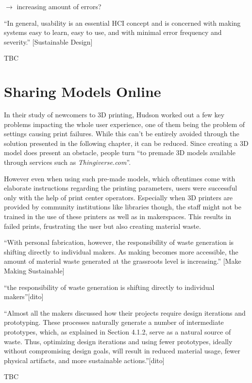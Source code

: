 $\rightarrow$ increasing amount of errors? 

``In general, usability is an essential HCI concept and is concerned with making systems easy to learn, easy to use, and with minimal error frequency and severity.'' [Sustainable Design]

TBC

\section{Sharing Models Online}

In their study of newcomers to 3D printing, Hudson \etal worked out a few key problems impacting the whole user experience, one of them being the problem of settings causing print failures.\cite{hudson_understanding_2016} 
While this can't be entirely avoided through the solution presented in the following chapter, it can be reduced. 
Since creating a 3D model does present an obstacle, people turn ``to premade 3D models available through services such as \textit{Thingiverse.com}''.\cite{hudson_understanding_2016}

However even when using such pre-made models, which oftentimes come with elaborate instructions regarding the printing parameters, users were successful only with the help of print center operators. 
Especially when 3D printers are provided by community institutions like libraries though, the staff might not be trained in the use of these printers as well as in makerspaces.
This results in failed prints, frustrating the user but also creating material waste. 


``With personal fabrication, however, the responsibility of waste generation is shifting directly to individual makers. As making becomes more accessible, the amount of material waste generated at the grassroots level is increasing.'' [Make Making Sustainable]

``the responsibility of waste generation is shifting directly to individual makers''[dito]

``Almost all the makers discussed how their projects require design iterations and prototyping. These processes naturally generate a number of intermediate prototypes, which, as explained in Section 4.1.2, serve as a natural source of waste. Thus, optimizing design iterations and using fewer prototypes, ideally without compromising design goals, will result in reduced material usage, fewer physical artifacts, and more sustainable actions.''[dito]

TBC


